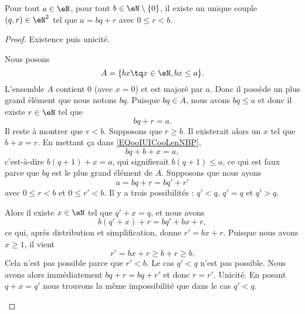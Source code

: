 \begin{theorem}       \label{THOooKDJVooRIJRHP}
	Pour tout \( a\in \eN\), pour tout \( b\in \eN\setminus\{ 0 \}\), il existe un unique couple \( (q,r)\in \eN^2\) tel que \( a=bq+r\) avec \( 0\leq r<b\).
\end{theorem}

\begin{proof}
	Existence puis unicité.
	\begin{subproof}
		\spitem[Existence]

		Nous posons
		\begin{equation}
			A=\{ bx\tq x\in \eN,bx\leq a \}.
		\end{equation}
		L'ensemble \( A\) contient \( 0\) (avec \( x=0\)) et est majoré par \( a\). Donc il possède un plus grand élément que nous notons \( bq\). Puisque \( bq\in A\), nous avons \( bq\leq a\) et donc il existe \( r\in \eN\) tel que
		\begin{equation}        \label{EQooIUICooLenNBP}
			bq+r=a.
		\end{equation}
		Il reste à montrer que \( r<b\). Supposons que \( r\geq b\). Il existerait alors un \( x\) tel que \( b+x=r\). En mettant ça dans \eqref{EQooIUICooLenNBP},
		\begin{equation}
			bq+b+x=a,
		\end{equation}
		c'est-à-dire \( b(q+1)+x=a\), qui signifierait \( b(q+1)\leq a\), ce qui est faux parce que \( bq\) est le plus grand élément de \( A\).
		\spitem[Unicité]
		Supposons que nous ayons
		\begin{equation}
			a=bq+r=bq'+r'
		\end{equation}
		avec \( 0\leq r<b\) et \( 0\leq r'<b\). Il y a trois possibilités : \( q'<q\), \( q'=q\) et \( q'>q\).
		\begin{subproof}
			\spitem[Si \( q'<q\)]
			Alors il existe \( x\in \eN\) tel que \( q'+x=q\), et nous avons
			\begin{equation}
				b(q'+x)+r=bq'+bx+r,
			\end{equation}
			ce qui, après distribution et simplification, donne \( r'=bx+r\). Puisque nous avons \( x\geq 1\), il vient
			\begin{equation}
				r'=bx+r\geq b+r\geq b.
			\end{equation}
			Cela n'est pas possible parce que \( r'<b\). Le cas \( q'<q\) n'est pas possible.
			\spitem[Si \( q'=q\)]
			Nous avons alors immédiatement \( bq+r=bq+r'\) et donc \( r=r'\). Unicité.
			\spitem[Si \( q'>q\)]
			En posant \( q+x=q'\) nous trouvons la même impossibilité que dans le cas \( q'<q\).
		\end{subproof}
	\end{subproof}
\end{proof}

